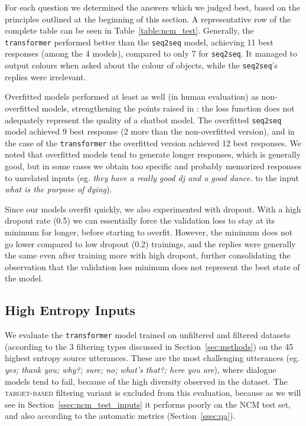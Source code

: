 \documentclass[11pt,a4paper]{article}
\begin{document}
For each question we determined the answers which we judged best, based on the
principles outlined at the beginning of this section. A representative row of the complete table can be seen in Table~\ref{table:ncm_test}. Generally,
the \texttt{transformer} performed better than the \texttt{seq2seq} model, achieving 11 best responses (among the 4 models), compared to only 7 for \texttt{seq2seq}. It managed to output colours when asked about the colour of objects, while the \texttt{seq2seq}'s replies were irrelevant.

Overfitted models performed at least as well (in human evaluation) as non-overfitted models,
strengthening the points raised in \citet{Csaky:2017, Tandon:2017}: the loss
function does not adequately represent the quality of a chatbot model. The overfitted \texttt{seq2seq} model achieved 9 best response (2 more than the non-overfitted version), and in the case of the \texttt{transformer} the overfitted version achieved 12 best responses. We noted that overfitted models tend to generate longer responses, which is generally good, but in some cases we obtain too specific
and probably memorized responses to unrelated inputs (eg. \textit{they have a
  really good dj and a good dance.}  to the input \textit{what is the purpose of
  dying}).

Since our models overfit quickly, we also experimented with dropout.
With a high dropout rate (0.5) we can essentially force the validation loss to stay at its minimum
for longer, before starting to overfit. However, the minimum does not
go lower compared to low dropout (0.2) trainings, and the replies were generally the
same even after training more with high dropout, further consolidating
the observation
that the validation loss minimum does not represent the best state of the model.

\subsection{High Entropy Inputs}
We evaluate the \texttt{transformer} model trained on unfiltered and filtered datasets (according to the 3 filtering types discussed in Section~\ref{sec:methods}) on the 45 highest entropy source utterances. These are the most challenging utterances (eg. \textit{yes; thank you; why?; sure; no; what's that?; here you are}), where dialogue models tend to fail, because of the high diversity observed in the dataset. The \textsc{target-based} filtering variant is excluded from this evaluation, because as we will see in Section~\ref{ssec:ncm_test_inputs} it performs poorly on the NCM test set, and also according to the automatic metrics (Section~\ref{ssec:qa}).
\end{document}
